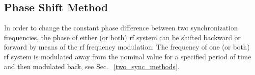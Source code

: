 %
%
%
%

\subsection{Phase Shift Method}
\label{sec:requirement_phase_shift}

In order to change the constant phase difference between two synchronization frequencies, the phase of either (or both) rf system can be shifted backward or forward by means of the rf frequency modulation. The frequency of one (or both) rf system is modulated away from the nominal value for a specified period of time and then modulated back, see Sec. ~\ref{two_sync_methods}.


